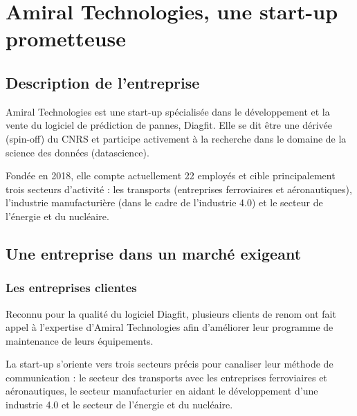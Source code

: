 \section{Amiral Technologies, une start-up prometteuse}
\subsection{Description de l'entreprise}
Amiral Technologies est une start-up spécialisée dans le développement et la vente du logiciel de prédiction de pannes, Diagfit.
Elle se dit être une dérivée (spin-off) du CNRS et participe activement à la recherche dans le domaine de la science des données (datascience).

Fondée en 2018, elle compte actuellement 22 employés et cible principalement trois secteurs d'activité : les transports (entreprises ferroviaires et aéronautiques), l'industrie manufacturière (dans le cadre de l'industrie 4.0) et le secteur de l'énergie et du nucléaire.

\subsection{Une entreprise dans un marché exigeant}
\subsubsection{Les entreprises clientes}
Reconnu pour la qualité du logiciel Diagfit, plusieurs clients de renom ont fait appel à l’expertise d’Amiral Technologies afin d'améliorer leur programme de maintenance de leurs équipements.

La start-up s'oriente vers trois secteurs précis pour canaliser leur méthode de communication : le secteur des transports avec les entreprises ferroviaires et aéronautiques, le secteur manufacturier en aidant le développement d'une industrie 4.0 et le secteur de l'énergie et du nucléaire.

